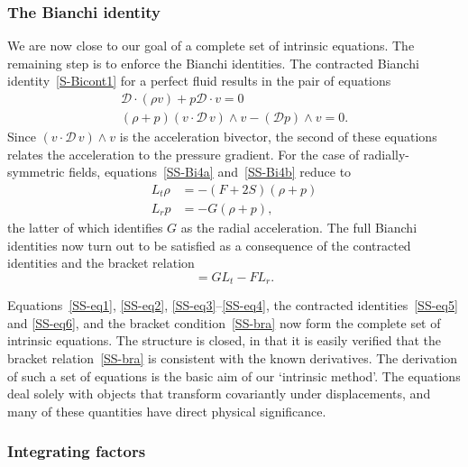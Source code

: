 \documentclass[a4paper]{article}
\numberwithin{equation}{section}
\newcommand{\dt}{\! \cdot \!}
\newcommand{\wdg}{\! \wedge \!}
\newcommand{\cld}{{\mathcal{D}}}
\begin{document}
\subsubsection*{The Bianchi identity}

We are now close to our goal of a complete set of intrinsic equations.
The remaining step is to enforce the Bianchi identities.  The
contracted Bianchi identity~\eqref{S-Bicont1} for a perfect fluid results
in the pair of equations
%
\begin{gather}
\cld \dt (\rho v) + p \cld \dt v = 0 \label{SS-Bi4a} \\
(\rho +p) (v \dt \cld \, v) \wdg v - (\cld p) \wdg v = 0. 
\label{SS-Bi4b}
\end{gather}
%
Since $(v\cdot\cld \, v)\wedge v$ is the acceleration bivector, the
second of these equations relates the acceleration to the pressure
gradient.  For the case of radially-symmetric fields,
equations~\eqref{SS-Bi4a} and~\eqref{SS-Bi4b} reduce to
%
\begin{align}
L_t \rho &= - (F + 2S) (\rho +p) \label{SS-eq5} \\
L_r p &= -G (\rho +p) \label{SS-eq6} ,
\end{align}
%
the latter of which identifies $G$ as the radial acceleration.  The
full Bianchi identities now turn out to be satisfied as a consequence
of the contracted identities and the bracket relation
%
\begin{equation}
[L_t, L_r] = G L_t - F L_r.
\label{SS-bra}
\end{equation}


Equations~\eqref{SS-eq1}, \eqref{SS-eq2}, \eqref{SS-eq3}--\eqref{SS-eq4}, the
contracted identities~\eqref{SS-eq5} and \eqref{SS-eq6}, and the bracket
condition~\eqref{SS-bra} now form the complete set of intrinsic equations.
The structure is closed, in that it is easily verified that the
bracket relation~\eqref{SS-bra} is consistent with the known derivatives.
The derivation of such a set of equations is the basic aim of our
`intrinsic method'.  The equations deal solely with objects that
transform covariantly under displacements, and many of these
quantities have direct physical significance.  


\subsubsection*{Integrating factors}
\end{document}
